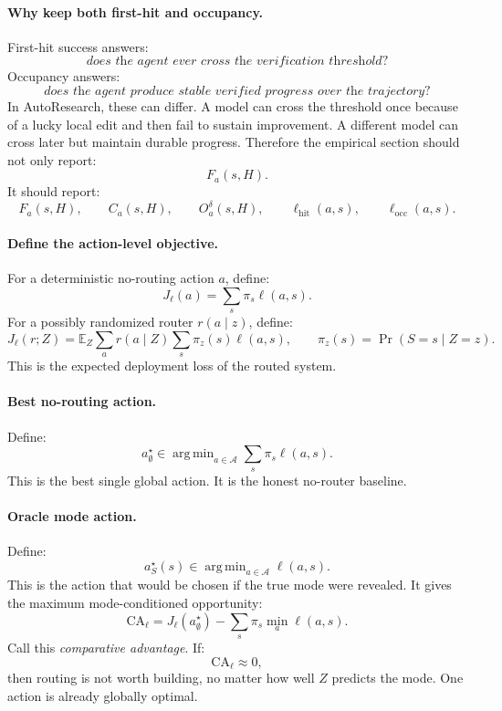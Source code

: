 \documentclass{article}
\DeclareMathOperator*{\argmin}{arg\,min}
\begin{document}
\paragraph{Why keep both first-hit and occupancy.}
First-hit success answers:
\[
    \textit{does the agent ever cross the verification threshold?}
\]
Occupancy answers:
\[
    \textit{does the agent produce stable verified progress over the trajectory?}
\]
In AutoResearch, these can differ.
A model can cross the threshold once because of a lucky local edit and then fail to sustain
improvement.
A different model can cross later but maintain durable progress.
Therefore the empirical section should not only report:
\[
    F_a(s,H).
\]
It should report:
\[
    F_a(s,H),
    \qquad
    C_a(s,H),
    \qquad
    O_a^\delta(s,H),
    \qquad
    \ell_{\mathrm{hit}}(a,s),
    \qquad
    \ell_{\mathrm{occ}}(a,s).
\]

\paragraph{Define the action-level objective.}
For a deterministic no-routing action \(a\), define:
\[
    J_\ell(a)
    =
    \sum_s \pi_s \ell(a,s).
\]
For a possibly randomized router \(r(a\mid z)\), define:
\[
    J_\ell(r;Z)
    =
    \mathbb E_Z
    \sum_a r(a\mid Z)
    \sum_s \pi_z(s)\ell(a,s),
    \qquad
    \pi_z(s)=\Pr(S=s\mid Z=z).
\]
This is the expected deployment loss of the routed system.

\paragraph{Best no-routing action.}
Define:
\[
    a^\star_{\emptyset}
    \in
    \argmin_{a\in\mathcal A}
    \sum_s \pi_s\ell(a,s).
\]
This is the best single global action.
It is the honest no-router baseline.

\paragraph{Oracle mode action.}
Define:
\[
    a^\star_S(s)
    \in
    \argmin_{a\in\mathcal A}\ell(a,s).
\]
This is the action that would be chosen if the true mode were revealed.
It gives the maximum mode-conditioned opportunity:
\[
    \mathrm{CA}_{\ell}
    =
    J_\ell(a^\star_{\emptyset})
    -
    \sum_s \pi_s\min_a \ell(a,s).
\]
Call this \emph{comparative advantage}.
If:
\[
    \mathrm{CA}_{\ell}\approx 0,
\]
then routing is not worth building, no matter how well \(Z\) predicts the mode.
One action is already globally optimal.
\end{document}

